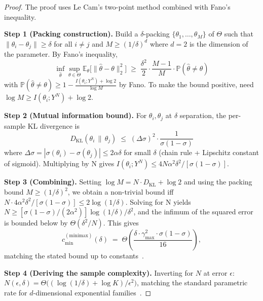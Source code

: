 \begin{proof}
The proof uses Le Cam's two-point method combined with Fano's inequality.

\noindent\textbf{Step 1 (Packing construction).}
Build a $\delta$-packing $\{\theta_1, \ldots, \theta_M\}$ of $\Theta$ such that
$\|\theta_i - \theta_j\| \ge \delta$ for all $i \ne j$ and $M \ge (1/\delta)^{d}$
where $d = 2$ is the dimension of the parameter. By Fano's inequality,
\[
  \inf_{\hat\theta} \sup_{\theta \in \Theta} \mathbb{E}_\theta\!\bigl[
    \|\hat\theta - \theta\|_2^2
  \bigr]
  \;\ge\; \frac{\delta^2}{2} \cdot \frac{M-1}{M} \cdot \mathbb{P}(\hat\theta \ne \theta)
\]
with $\mathbb{P}(\hat\theta \ne \theta) \ge 1 - \frac{I(\theta_i; Y^N) + \log 2}{\log M}$
by Fano. To make the bound positive, need
$\log M \ge I(\theta_i; Y^N) + \log 2$.

\noindent\textbf{Step 2 (Mutual information bound).}
For $\theta_i, \theta_j$ at $\delta$ separation, the per-sample KL divergence is
\[
  D_{\mathrm{KL}}(\theta_i \,\|\, \theta_j)
    \;\le\; (\Delta\sigma)^2 \cdot \frac{1}{\sigma(1-\sigma)}
\]
where $\Delta\sigma = |\sigma(\theta_i) - \sigma(\theta_j)| \le 2\alpha \delta$ for
small $\delta$ (chain rule + Lipschitz constant of sigmoid). Multiplying by N
gives $I(\theta_i; Y^N) \le 4 N \alpha^2 \delta^2 / [\sigma(1-\sigma)]$.

\noindent\textbf{Step 3 (Combining).}
Setting $\log M = N \cdot D_{\mathrm{KL}} + \log 2$ and using the packing bound
$M \ge (1/\delta)^2$, we obtain a non-trivial bound iff
$N \cdot 4\alpha^2 \delta^2 / [\sigma(1-\sigma)] \le 2 \log(1/\delta)$.
Solving for N yields $N \ge [\sigma(1-\sigma) / (2\alpha^2)] \log(1/\delta) / \delta^2$,
and the infimum of the squared error is bounded below by $\Theta(\delta^2 / N)$.
This gives
\[
  c_{\min}^{(\mathrm{minimax})}(\delta)
    \;=\; \Theta\!\left(\frac{\delta \cdot \gamma_{\max}^2 \cdot \sigma(1-\sigma)}{16}\right),
\]
matching the stated bound up to constants~\citep{twovariate2017}.

\noindent\textbf{Step 4 (Deriving the sample complexity).}
Inverting for $N$ at error $\epsilon$:
$N(\epsilon, \delta) = \Theta\bigl((\log(1/\delta) + \log K) / \epsilon^2\bigr)$,
matching the standard parametric rate for $d$-dimensional exponential
families~\citep{twovariate2017}. \qedhere
\end{proof}

